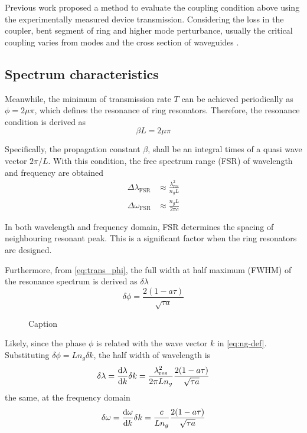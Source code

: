 Previous work \cite{Yusuke2017} proposed a method to evaluate the coupling condition above using the experimentally measured device transmission. Considering the loss in the coupler, bent segment of ring and higher mode perturbance, usually the critical coupling varies from modes and the cross section of waveguides \cite{Pfeiffer2017}.

\subsection{Spectrum characteristics}
Meanwhile, the minimum of transmission rate $T$ can be achieved periodically as $\phi=2 \mu \pi$, which defines the resonance of ring resonators. Therefore, the resonance condition is derived as
\begin{equation}
    \beta L =2 \mu \pi
\end{equation}
    
Specifically, the propagation constant $\beta$, shall be an integral times of a quasi wave vector $2\pi/L$. With this condition, the free spectrum range (FSR) of wavelength and frequency are obtained
\begin{align}
    \Delta \lambda_\mathrm{FSR} &\approx \frac{\lambda_\mathrm{res}^2}{n_g L} \label{eq:fsr-wl} \\
    \Delta \omega_\mathrm{FSR} &\approx \frac{n_g L}{2\pi c} \label{eq:fsr-w}
\end{align}

In both wavelength and frequency domain, FSR determines the spacing of neighbouring resonant peak. This is a significant factor when the ring resonators are designed.

Furthermore, from \autoref{eq:trans_phi}, the full width at half maximum (FWHM) of the resonance spectrum is derived as $\delta\lambda$
\begin{equation}\label{eq:fwhm_phi}
    \delta\phi = \frac{2(1- a \tau)}{\sqrt{\tau a}}
\end{equation}
\begin{figure}
    \centering
    
    \caption{Caption}
    \label{fig:my_label}
\end{figure}

Likely, since the phase $\phi$ is related with the wave vector $k$ in \autoref{eq:ng-def}. Substituting $\delta \phi = L n_g \delta k$, the half width of wavelength is
\begin{equation}
    \delta \lambda = \dv{\lambda}{k}\delta k = \frac{\lambda_\mathrm{res}^2}{2\pi L n_g} \frac{2(1- a \tau)}{\sqrt{\tau a}} \label{eq:fwhm_wl}
\end{equation}
the same, at the frequency domain
\begin{equation}
    \delta \omega = \dv{\omega}{k}\delta k = \frac{c}{ L n_g} \frac{2(1- a \tau)}{\sqrt{\tau a}} \label{eq:fwhm_w}
\end{equation}

